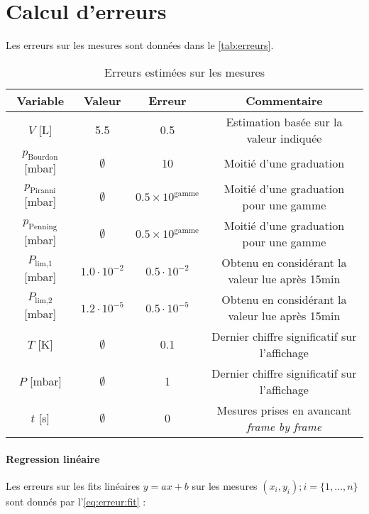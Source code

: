 \section{Calcul d'erreurs}

Les erreurs sur les mesures sont données dans le \autoref{tab:erreurs}.

\begin{table}[h]
    \centering
    \begin{tabulary}{\textwidth}{C C C C}
        \toprule
        Variable & Valeur & Erreur & Commentaire \\
        \midrule
        \(V\) [\si{\liter}] & 5.5 & 0.5 & Estimation basée sur la valeur indiquée \\
        \(p_\textrm{Bourdon}\) [\si{\milli\bar}] & \(\emptyset\) & 10 & Moitié d'une graduation \\
        \(p_\textrm{Piranni}\) [\si{\milli\bar}] & \(\emptyset\) & \(0.5 \times 10^\textrm{gamme}\) & Moitié d'une graduation pour une gamme \\
        \(p_\textrm{Penning}\) [\si{\milli\bar}] & \(\emptyset\) & \(0.5 \times 10^\textrm{gamme}\) & Moitié d'une graduation pour une gamme \\
        \(P_\textrm{lim,1}\) [\si{\milli\bar}] & \(1.0 \cdot 10^{-2}\) & \(0.5 \cdot 10^{-2}\) & Obtenu en considérant la valeur lue après 15min \\
        \(P_\textrm{lim,2}\) [\si{\milli\bar}] & \(1.2 \cdot 10^{-5}\) & \(0.5 \cdot 10^{-5}\) & Obtenu en considérant la valeur lue après 15min \\
        \midrule
        \(T\) [\si{\kelvin}] & \(\emptyset\) & 0.1 & Dernier chiffre significatif sur l'affichage \\
        \(P\) [\si{\milli\bar}] & \(\emptyset\) & 1 & Dernier chiffre significatif sur l'affichage \\
        \(t\) [\si{\second}] & \(\emptyset\) & 0 & Mesures prises en avancant \textit{frame by frame} \\
        \bottomrule
    \end{tabulary}
    \caption{Erreurs estimées sur les mesures}
    \label{tab:erreurs}
\end{table}

\paragraph*{Regression linéaire}
Les erreurs sur les fits linéaires \(y = ax + b\) sur les mesures \((x_i, y_i) ; i = \{1, \hdots, n\}\) sont donnés par l'\autoref{eq:erreur:fit} \cite{erreursmesure}:

